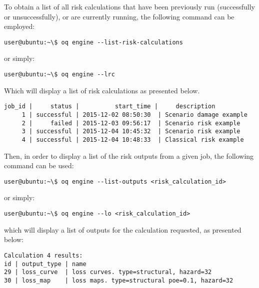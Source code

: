 To obtain a list of all risk calculations that have been previously run
(successfully or unsuccessfully), or are currently running, the following
command can be employed:

\begin{verbatim}
user@ubuntu:~\$ oq engine --list-risk-calculations
\end{verbatim}

or simply:

\begin{verbatim}
user@ubuntu:~\$ oq engine --lrc
\end{verbatim}

Which will display a list of risk calculations as presented below.

\begin{verbatim}
job_id |     status |          start_time |     description
     1 | successful | 2015-12-02 08:50:30  | Scenario damage example
     2 |     failed | 2015-12-03 09:56:17  | Scenario risk example
     3 | successful | 2015-12-04 10:45:32  | Scenario risk example
     4 | successful | 2015-12-04 10:48:33  | Classical risk example
\end{verbatim}

Then, in order to display a list of the risk outputs from a given job, the
following command can be used:

\begin{verbatim}
user@ubuntu:~\$ oq engine --list-outputs <risk_calculation_id>
\end{verbatim}

or simply:

\begin{verbatim}
user@ubuntu:~\$ oq engine --lo <risk_calculation_id>
\end{verbatim}

which will display a list of outputs for the calculation requested, as
presented below:

\begin{verbatim}
Calculation 4 results:
id | output_type | name
29 | loss_curve  | loss curves. type=structural, hazard=32
30 | loss_map    | loss maps. type=structural poe=0.1, hazard=32
\end{verbatim}

